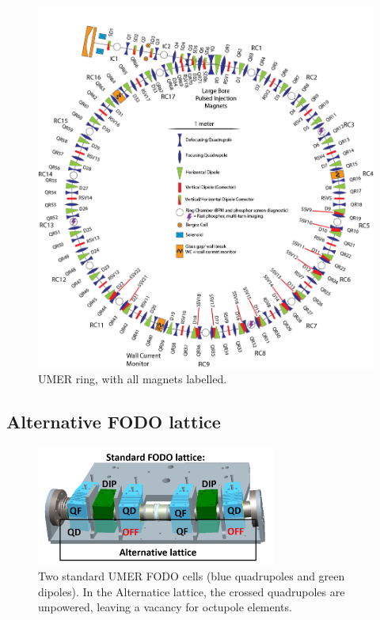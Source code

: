 \begin{figure}[]
   \centering
   \includegraphics[width=\textwidth]{umer-diagram/full_ring.png}
   \caption{UMER ring, with all magnets labelled.}
   \label{fig:umerring}
\end{figure}

\subsection{Alternative FODO lattice}

\begin{figure}[]
   \centering
   \includegraphics[width=0.7\textwidth]{6.figures/UMER_FODO.png}
   \caption{Two standard UMER FODO cells (blue quadrupoles and green dipoles). In the Alternatice lattice, the crossed quadrupoles are unpowered, leaving a vacancy for octupole elements.}
   \label{fig:FODOcell}
\end{figure}

